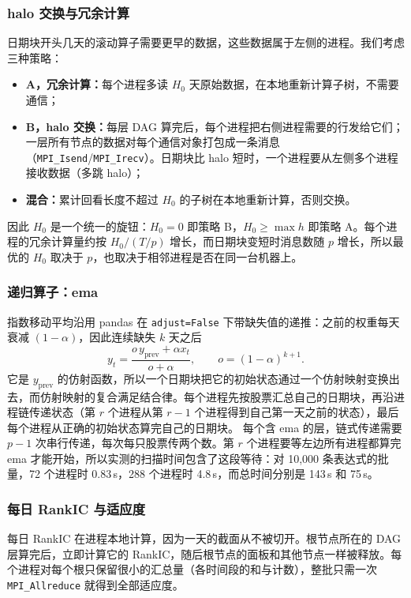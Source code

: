 \documentclass[11pt,a4paper,UTF8,fontset=fandol]{ctexart}
\newcommand{\code}[1]{\texttt{#1}}
\begin{document}
\subsubsection{halo 交换与冗余计算}
\label{sec:halo}
日期块开头几天的滚动算子需要更早的数据，这些数据属于左侧的进程。我们考虑三种策略：
\begin{itemize}[nosep]
  \item \textbf{A，冗余计算：}每个进程多读 $H_0$ 天原始数据，在本地重新计算子树，不需要通信；
  \item \textbf{B，halo 交换：}每层 DAG 算完后，每个进程把右侧进程需要的行发给它们；一层所有节点的数据对每个通信对象打包成一条消息（\code{MPI\_Isend}/\code{MPI\_Irecv}）。日期块比 halo 短时，一个进程要从左侧多个进程接收数据（多跳 halo）；
  \item \textbf{混合：}累计回看长度不超过 $H_0$ 的子树在本地重新计算，否则交换。
\end{itemize}
因此 $H_0$ 是一个统一的旋钮：$H_0=0$ 即策略 B，$H_0\ge \max h$ 即策略 A。每个进程的冗余计算量约按 $H_0/(T/p)$ 增长，而日期块变短时消息数随 $p$ 增长，所以最优的 $H_0$ 取决于 $p$，也取决于相邻进程是否在同一台机器上。

\subsubsection{递归算子：ema}
\label{sec:ema}
指数移动平均沿用 pandas 在 \code{adjust=False} 下带缺失值的递推：之前的权重每天衰减 $(1-\alpha)$，因此连续缺失 $k$ 天之后
\begin{equation}
  y_t = \frac{o\,y_{\text{prev}} + \alpha x_t}{o+\alpha}, \qquad o = (1-\alpha)^{k+1}.
\end{equation}
它是 $y_{\text{prev}}$ 的仿射函数，所以一个日期块把它的初始状态通过一个仿射映射变换出去，而仿射映射的复合满足结合律。每个进程先按股票汇总自己的日期块，再沿进程链传递状态（第 $r$ 个进程从第 $r-1$ 个进程得到自己第一天之前的状态），最后每个进程从正确的初始状态算完自己的日期块。
每个含 ema 的层，链式传递需要 $p-1$ 次串行传递，每次每只股票传两个数。第 $r$ 个进程要等左边所有进程都算完 ema 才能开始，所以实测的扫描时间包含了这段等待：对 10{,}000 条表达式的批量，72 个进程时 0.83\,s，288 个进程时 4.8\,s，而总时间分别是 143\,s 和 75\,s。

\subsubsection{每日 RankIC 与适应度}
每日 RankIC 在进程本地计算，因为一天的截面从不被切开。根节点所在的 DAG 层算完后，立即计算它的 RankIC，随后根节点的面板和其他节点一样被释放。每个进程对每个根只保留很小的汇总量（各时间段的和与计数），整批只需一次 \code{MPI\_Allreduce} 就得到全部适应度。
\end{document}
